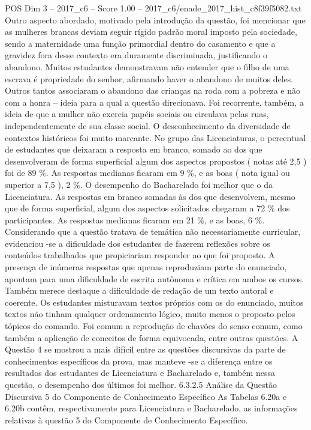 \begin{textsample}{POS Dim 3 – 2017\_c6 – Score 1.00 – 2017\_c6/enade\_2017\_hist\_c8f39f5082.txt}
Outro aspecto abordado, motivado pela introdução da questão, foi mencionar que as mulheres brancas deviam seguir rígido padrão moral imposto pela sociedade, sendo a maternidade uma função primordial dentro do casamento e que a gravidez fora desse contexto era duramente discriminada, justificando o abandono.
Muitos estudantes demonstravam não entender que o filho de uma escrava é propriedade do senhor, afirmando haver o abandono de muitos deles.
Outros tantos associaram o abandono das crianças na roda com a pobreza e não com a honra – ideia para a qual a questão direcionava.
Foi recorrente, também, a ideia de que a mulher não exercia papéis sociais ou circulava pelas ruas, independentemente de sua classe social.
O desconhecimento da diversidade de contextos históricos foi muito marcante.
No grupo das Licenciaturas, o percentual de estudantes que deixaram a resposta em branco, somado ao dos que desenvolveram de forma superficial algum dos aspectos propostos ( notas até 2,5 ) foi de 89 \%.
As respostas medianas ficaram em 9 \%, e as boas ( nota igual ou superior a 7,5 ), 2 \%.
O desempenho do Bacharelado foi melhor que o da Licenciatura.
As respostas em branco somadas às dos que desenvolvem, mesmo que de forma superficial, algum dos aspectos solicitados chegaram a 72 \% dos participantes.
As respostas medianas ficaram em 21 \%, e as boas, 6 \%.
Considerando que a questão tratava de temática não necessariamente curricular, evidenciou -se a dificuldade dos estudantes de fazerem reflexões sobre os conteúdos trabalhados que propiciariam responder ao que foi proposto.
A presença de inúmeras respostas que apenas reproduziam parte do enunciado, apontam para uma dificuldade de escrita autônoma e crítica em ambos os cursos.
Também merece destaque a dificuldade de redação de um texto autoral e coerente.
Os estudantes misturavam textos próprios com os do enunciado, muitos textos não tinham qualquer ordenamento lógico, muito menos o proposto pelos tópicos do comando.
Foi comum a reprodução de chavões do senso comum, como também a aplicação de conceitos de forma equivocada, entre outras questões.
A Questão 4 se mostrou a mais difícil entre as questões discursivas da parte de conhecimentos específicos da prova, mas manteve -se a diferença entre os resultados dos estudantes de Licenciatura e Bacharelado e, também nessa questão, o desempenho dos últimos foi melhor. 6.3.2.5 Análise da Questão Discursiva 5 do Componente de Conhecimento Específico As Tabelas 6.20a e 6.20b contêm, respectivamente para Licenciatura e Bacharelado, as informações relativas à questão 5 do Componente de Conhecimento Específico.

\end{textsample}
